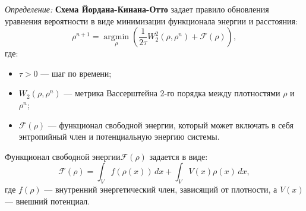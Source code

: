 \textit{Определение:}  \textbf{Схема Йордана-Кинана-Отто} задает правило обновления уравнения вероятности в виде
минимизации функционала энергии и расстояния:
\begin{equation}
    \rho^{n+1} = \underset{\rho}{\operatorname{argmin}} \left( \frac{1}{2\tau} W_2^2(\rho, \rho^n) + \mathcal{F}(\rho) \right),
\end{equation}
где:\begin{itemize}
    \item \(\tau > 0\) --- шаг по времени;
    \item \(W_2(\rho, \rho^n)\) --- метрика Вассерштейна 2-го порядка между плотностями \(\rho\) и \(\rho^n\);
    \item  \(\mathcal{F}(\rho)\) --- функционал свободной энергии, который может включать в себя энтропийный член и 
    потенциальную энергию системы.
\end{itemize}
Функционал свободной энергии\(\mathcal{F}(\rho)\) задается в виде:
\begin{equation}
    \mathcal{F}(\rho) = \int_V f(\rho(x)) \, dx + \int_V V(x) \rho(x) \, dx,
\end{equation}
где \(f(\rho)\) — внутренний энергетический член, зависящий от плотности, а \(V(x)\) — внешний потенциал.



